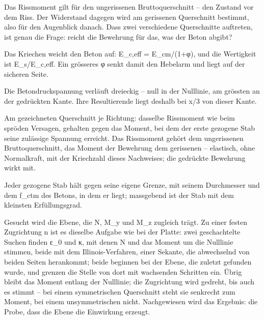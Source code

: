 \documentclass[11pt,a4paper]{article}
\begin{document}
Das Rissmoment gilt für den ungerissenen Bruttoquerschnitt – den Zustand vor dem Riss. Der Widerstand dagegen wird am gerissenen Querschnitt bestimmt, also für den Augenblick danach. Dass zwei verschiedene Querschnitte auftreten, ist genau die Frage: reicht die Bewehrung für das, was der Beton abgibt?

Das Kriechen weicht den Beton auf: E\_c,eff = E\_cm/(1+φ), und die Wertigkeit ist E\_s/E\_c,eff. Ein grösseres φ senkt damit den Hebelarm und liegt auf der sicheren Seite.

Die Betondruckspannung verläuft dreieckig – null in der Nulllinie, am grössten an der gedrückten Kante. Ihre Resultierende liegt deshalb bei x/3 von dieser Kante.

Am gezeichneten Querschnitt je Richtung: dasselbe Rissmoment wie beim spröden Versagen, gehalten gegen das Moment, bei dem der erste gezogene Stab seine zulässige Spannung erreicht. Das Rissmoment gehört dem ungerissenen Bruttoquerschnitt, das Moment der Bewehrung dem gerissenen – elastisch, ohne Normalkraft, mit der Kriechzahl dieses Nachweises; die gedrückte Bewehrung wirkt mit.

Jeder gezogene Stab hält gegen seine eigene Grenze, mit seinem Durchmesser und dem f\_ctm des Betons, in dem er liegt; massgebend ist der Stab mit dem kleinsten Erfüllungsgrad.

Gesucht wird die Ebene, die N, M\_y und M\_z zugleich trägt. Zu einer festen Zugrichtung n ist es dieselbe Aufgabe wie bei der Platte: zwei geschachtelte Suchen finden ε\_0 und κ, mit denen N und das Moment um die Nulllinie stimmen, beide mit dem Illinois-Verfahren, einer Sekante, die abwechselnd von beiden Seiten herankommt; beide beginnen bei der Ebene, die zuletzt gefunden wurde, und grenzen die Stelle von dort mit wachsenden Schritten ein. Übrig bleibt das Moment entlang der Nulllinie; die Zugrichtung wird gedreht, bis auch es stimmt – bei einem symmetrischen Querschnitt steht sie senkrecht zum Moment, bei einem unsymmetrischen nicht. Nachgewiesen wird das Ergebnis: die Probe, dass die Ebene die Einwirkung erzeugt.
\end{document}
